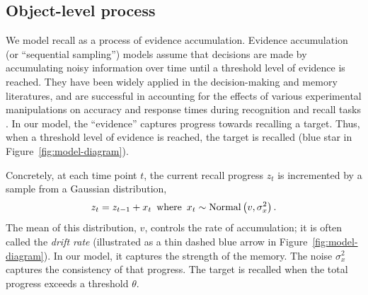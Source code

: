 \subsection{Object-level process}

We model recall as a process of evidence accumulation. Evidence accumulation (or ``sequential sampling'') models assume that decisions are made by accumulating noisy information over time until a threshold level of evidence is reached. They have been widely applied in the decision-making \citep{busemeyer1993decision,usher2001time,ditterich2006stochastic,krajbich2010visual} and memory \citep{ratcliff1978theory,sederberg2008context} literatures, and are successful in accounting for the effects of various experimental manipulations on accuracy and response times during recognition and recall tasks \citep{ratcliff2002estimating,sederberg2008context,yonelinas2010recollection}. In our model, the ``evidence'' captures progress towards recalling a target. Thus, when a threshold level of evidence is reached, the target is recalled (blue star in Figure~\ref{fig:model-diagram}).

Concretely, at each time point $t$, the current recall progress $z_t$ is incremented by a sample from a Gaussian distribution,
%
\begin{equation}\label{eq:evidence}
  z_t = z_{t-1} + x_t \,\text{ where }\,
  x_t \sim \mathrm{Normal}\left( v, \sigma_x^2 \right).
\end{equation}
%
The mean of this distribution, $v$, controls the rate of accumulation; it is often called the \emph{drift rate} (illustrated as a thin dashed blue arrow in Figure~\ref{fig:model-diagram}). In our model, it captures the strength of the memory. The noise $\sigma_x^2$ captures the consistency of that progress. The target is recalled when the total progress exceeds a threshold $\theta$.


